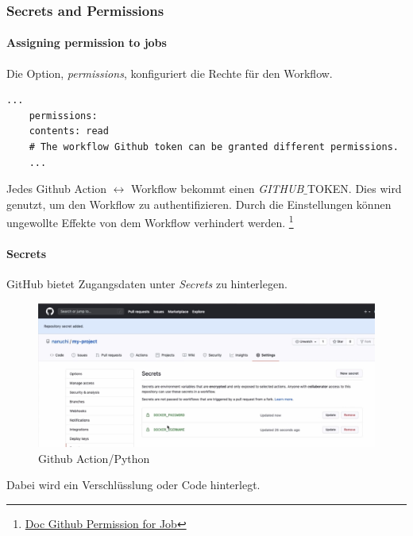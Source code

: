 
\subsubsection{Secrets and Permissions}
\paragraph{Assigning permission to jobs}  Die Option, \textit{permissions}, konfiguriert die Rechte für den Workflow. 

\begin{lstlisting}[style=Config, caption={Example Permission}, captionpos=b]
	...
	permissions:
	contents: read
	# The workflow Github token can be granted different permissions.
	...
\end{lstlisting}

Jedes Github Action $\leftrightarrow$ Workflow bekommt einen \textit{GITHUB}$\_$TOKEN. Dies wird genutzt, um den Workflow zu authentifizieren. Durch die Einstellungen können ungewollte Effekte von dem Workflow verhindert werden.
\footnote{
	\href{https://docs.github.com/en/actions/using-jobs/assigning-permissions-to-jobs}{Doc Github Permission for Job}
}

\paragraph{Secrets}
GitHub bietet Zugangsdaten unter \textit{Secrets} zu hinterlegen.

\begin{figure}[H]
	\centering
	\includegraphics[scale = 0.2]{attachment/chapter_2/Scc105}
	\caption{Github Action/Python}
\end{figure}
Dabei wird ein Verschlüsslung oder Code hinterlegt.

